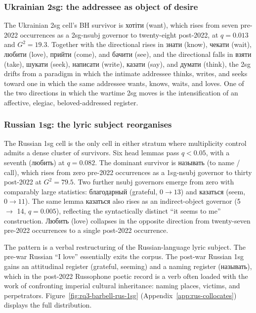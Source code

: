 \documentclass[12pt]{interact}
\theoremstyle{plain}%
\theoremstyle{definition}
\theoremstyle{remark}
\begin{document}
\subsubsection{Ukrainian 2sg: the addressee as object of desire}

The Ukrainian 2sg cell's BH survivor is \textukrainian{хотіти} (want), which rises from seven pre-2022 occurrences as a 2sg-nsubj governor to twenty-eight post-2022, at $q = 0.013$ and $G^2 = 19.3$. Together with the directional rises in \textukrainian{знати} (know), \textukrainian{чекати} (wait), \textukrainian{любити} (love), \textukrainian{прийти} (come), and \textukrainian{бачити} (see), and the directional falls in \textukrainian{взяти} (take), \textukrainian{шукати} (seek), \textukrainian{написати} (write), \textukrainian{казати} (say), and \textukrainian{думати} (think), the 2sg drifts from a paradigm in which the intimate addressee thinks, writes, and seeks toward one in which the same addressee wants, knows, waits, and loves. One of the two directions in which the wartime 2sg moves is the intensification of an affective, elegiac, beloved-addressed register.

\subsubsection{Russian 1sg: the lyric subject reorganises}

The Russian 1sg cell is the only cell in either stratum where multiplicity control admits a dense cluster of survivors. Six head lemmas pass $q < 0.05$, with a seventh (\textukrainian{любить}) at $q = 0.082$. The dominant survivor is \textukrainian{называть} (to name / call), which rises from zero pre-2022 occurrences as a 1sg-nsubj governor to thirty post-2022 at $G^2 = 79.5$. Two further nsubj governors emerge from zero with comparably large statistics: \textukrainian{благодарный} (grateful, $0 \to 13$) and \textukrainian{казаться} (seem, $0 \to 11$). The same lemma \textukrainian{казаться} also rises as an indirect-object governor (5 $\to$ 14, $q = 0.005$), reflecting the syntactically distinct ``it seems to me'' construction. \textukrainian{Любить} (love) collapses in the opposite direction from twenty-seven pre-2022 occurrences to a single post-2022 occurrence.

The pattern is a verbal restructuring of the Russian-language lyric subject. The pre-war Russian ``I love'' essentially exits the corpus. The post-war Russian 1sg gains an attitudinal register (grateful, seeming) and a naming register (\textukrainian{называть}), which in the post-2022 Russophone poetic record is a verb often loaded with the work of confronting imperial cultural inheritance: naming places, victims, and perpetrators. Figure~\ref{fig:rq3-barbell-rus-1sg} (Appendix~\ref{app:rus-collocates}) displays the full distribution.
\end{document}
